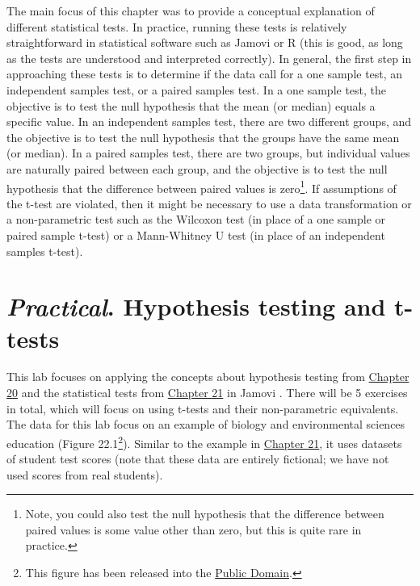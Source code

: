 \documentclass[
]{scrbook}
\begin{document}
The main focus of this chapter was to provide a conceptual explanation of different statistical tests.
In practice, running these tests is relatively straightforward in statistical software such as Jamovi or R (this is good, as long as the tests are understood and interpreted correctly).
In general, the first step in approaching these tests is to determine if the data call for a one sample test, an independent samples test, or a paired samples test.
In a one sample test, the objective is to test the null hypothesis that the mean (or median) equals a specific value.
In an independent samples test, there are two different groups, and the objective is to test the null hypothesis that the groups have the same mean (or median).
In a paired samples test, there are two groups, but individual values are naturally paired between each group, and the objective is to test the null hypothesis that the difference between paired values is zero\footnote{Note, you could also test the null hypothesis that the difference between paired values is some value other than zero, but this is quite rare in practice.}.
If assumptions of the t-test are violated, then it might be necessary to use a data transformation or a non-parametric test such as the Wilcoxon test (in place of a one sample or paired sample t-test) or a Mann-Whitney U test (in place of an independent samples t-test).

\hypertarget{Chapter_22}{%
\chapter{\texorpdfstring{\emph{Practical}. Hypothesis testing and t-tests}{Practical. Hypothesis testing and t-tests}}\label{Chapter_22}}

This lab focuses on applying the concepts about hypothesis testing from \protect\hyperlink{Chapter_20}{Chapter 20} and the statistical tests from \protect\hyperlink{Chapter_21}{Chapter 21} in Jamovi \citep{Jamovi2022}.
There will be 5 exercises in total, which will focus on using t-tests and their non-parametric equivalents.
The data for this lab focus on an example of biology and environmental sciences education (Figure 22.1\footnote{This figure has been released into the \href{https://commons.wikimedia.org/wiki/File:Teach_in_pine_needles.jpg}{Public Domain}.}).
Similar to the example in \protect\hyperlink{Chapter_21}{Chapter 21}, it uses datasets of student test scores (note that these data are entirely fictional; we have not used scores from real students).
\end{document}
